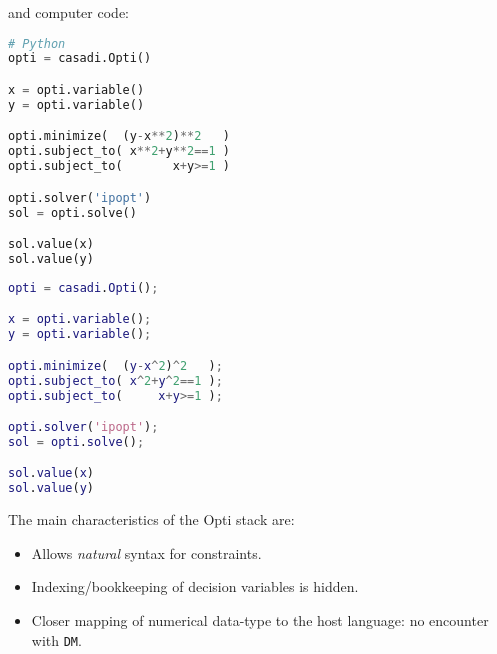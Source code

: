 \documentclass[a4paper,12pt]{book}
\begin{document}
and computer code:\\
\begin{minipage}[t]{0.5\textwidth}
\begin{lstlisting}[language=Python]
# Python
opti = casadi.Opti()

x = opti.variable()
y = opti.variable()

opti.minimize(  (y-x**2)**2   )
opti.subject_to( x**2+y**2==1 )
opti.subject_to(       x+y>=1 )

opti.solver('ipopt')
sol = opti.solve()

sol.value(x)
sol.value(y)
\end{lstlisting}
\end{minipage}
\begin{minipage}[t]{0.5\textwidth}
\begin{lstlisting}[language=Matlab]
% MATLAB/Octave
opti = casadi.Opti();

x = opti.variable();
y = opti.variable();

opti.minimize(  (y-x^2)^2   );
opti.subject_to( x^2+y^2==1 );
opti.subject_to(     x+y>=1 );

opti.solver('ipopt');
sol = opti.solve();

sol.value(x)
sol.value(y)
\end{lstlisting}
\end{minipage}

The main characteristics of the Opti stack are:

\begin{itemize}
  \item Allows \emph{natural} syntax for constraints.
  \item Indexing/bookkeeping of decision variables is hidden.
  \item Closer mapping of numerical data-type to the host language: no encounter with \texttt{DM}.
\end{itemize}


%
%
%
%
%
%
%
%
%
%
%
%
\end{document}
